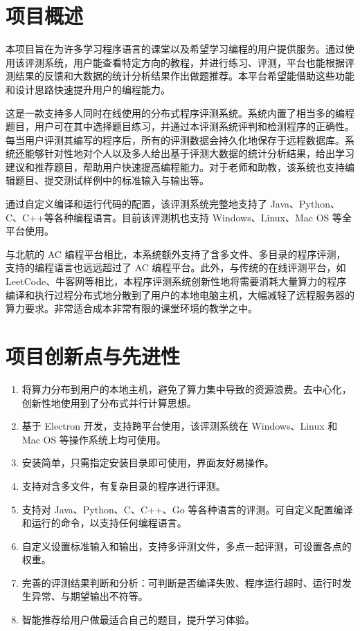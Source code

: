 \section{项目概述}

本项目旨在为许多学习程序语言的课堂以及希望学习编程的用户提供服务。通过使用该评测系统，用户能查看特定方向的教程，并进行练习、评测，平台也能根据评测结果的反馈和大数据的统计分析结果作出做题推荐。本平台希望能借助这些功能和设计思路快速提升用户的编程能力。

这是一款支持多人同时在线使用的分布式程序评测系统。系统内置了相当多的编程题目，用户可在其中选择题目练习，并通过本评测系统评判和检测程序的正确性。每当用户评测其编写的程序后，所有的评测数据会持久化地保存于远程数据库。系统还能够针对性地对个人以及多人给出基于评测大数据的统计分析结果，给出学习建议和推荐题目，帮助用户快速提高编程能力。对于老师和助教，该系统也支持编辑题目、提交测试样例中的标准输入与输出等。

通过自定义编译和运行代码的配置，该评测系统完整地支持了 Java、Python、C、C++等各种编程语言\cite{wu2012development}。目前该评测机也支持 Windows、Linux、Mac OS 等全平台使用。

与北航的 AC 编程平台相比，本系统额外支持了含多文件、多目录的程序评测，支持的编程语言也远远超过了 AC 编程平台。此外，与传统的在线评测平台，如 LeetCode、牛客网等相比，本程序评测系统创新性地将需要消耗大量算力的程序编译和执行过程分布式地分散到了用户的本地电脑主机，大幅减轻了远程服务器的算力要求。非常适合成本非常有限的课堂环境的教学之中。

\section{项目创新点与先进性}

\begin{enumerate}
    \item 将算力分布到用户的本地主机，避免了算力集中导致的资源浪费。去中心化，创新性地使用到了分布式并行计算思想。
    \item 基于 Electron 开发，支持跨平台使用，该评测系统在 Windows、Linux 和 Mac OS 等操作系统上均可使用。
    \item 安装简单，只需指定安装目录即可使用，界面友好易操作。
    \item 支持对含多文件，有复杂目录的程序进行评测。
    \item 支持对 Java、Python、C、C++、Go 等各种语言的评测。可自定义配置编译和运行的命令，以支持任何编程语言。
    \item 自定义设置标准输入和输出，支持多评测文件，多点一起评测，可设置各点的权重。
    \item 完善的评测结果判断和分析：可判断是否编译失败、程序运行超时、运行时发生异常、与期望输出不符等。
    \item 智能推荐给用户做最适合自己的题目，提升学习体验。
\end{enumerate}

